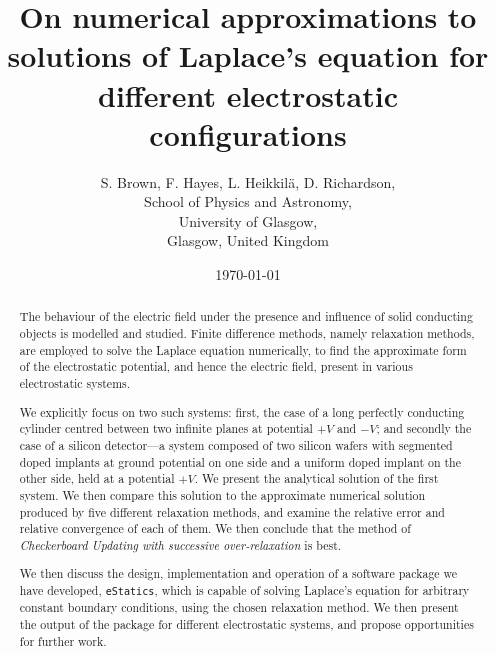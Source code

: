 \documentclass[11pt, a4paper]{article}
\begin{document}
\title{On numerical approximations to solutions of Laplace's equation for different
electrostatic configurations}
\author{S. Brown, F. Hayes, L. Heikkil{\"a}, D. Richardson,\\
	School of Physics and Astronomy,\\
	University of Glasgow,\\
	Glasgow, United Kingdom}
\date{\today}
\maketitle

\begin{abstract}

The behaviour of the electric field under the presence and influence of solid
conducting objects is modelled and studied. Finite difference methods, namely
relaxation methods, are employed to solve the Laplace equation numerically,
to find the approximate form of the electrostatic potential, and hence the electric
field, present in various electrostatic systems.

We explicitly focus on two such systems: first, the case of a long perfectly conducting
cylinder centred between two infinite planes at potential $+V$ and $-V$; and secondly 
the case of a silicon detector---a system composed of two silicon wafers with segmented
doped implants at ground potential on one side and a uniform doped implant on the
other side, held at a potential $+V$. We present the analytical solution of the first
system. We then compare this solution to the approximate numerical solution produced
by five different relaxation methods, and examine the relative error and relative
convergence of each of them. We then conclude that the method of 
\emph{Checkerboard Updating with successive over-relaxation} is best.

We then discuss the design, implementation and operation of a software package we have
developed, \lstinline|eStatics|, which is capable of solving Laplace's equation for
arbitrary constant boundary conditions, using the chosen relaxation method. We then
present the output of the package for different electrostatic systems, and propose
opportunities for further work.

\end{abstract}

\newpage                       %
\tableofcontents               %
\newpage                       %
\end{document}
